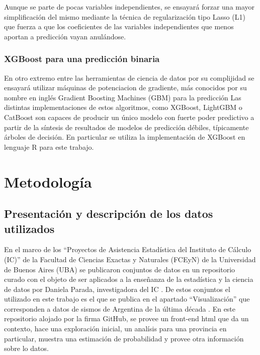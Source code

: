 \documentclass[a4paper]{report}
\begin{document}
Aunque se parte de pocas variables independientes, se ensayará forzar una mayor simplificación del mismo mediante la técnica de regularización tipo Lasso (L1) que fuerza a que los coeficientes de las variables independientes que menos aportan a predicción vayan anulándose.


\subsection{XGBoost para una predicción binaria}

En otro extremo entre las herramientas de ciencia de datos por su complijidad se ensayará utilizar máquinas de potenciacion de gradiente, más conocidos por su nombre en inglés Gradient Boosting Machines (GBM) para la predicción
Las distintas implementaciones de estos algoritmos, como XGBoost, LightGBM o CatBoost son capaces de producir un único modelo con fuerte poder predictivo a partir de la síntesis de resultados de modelos de predicción débiles, típicamente árboles de decisión. 
En particular se utiliza la implementación de XGBoost en lenguaje R para este trabajo.






\chapter{Metodología}

\section{Presentación y descripción de los datos utilizados}

En el marco de los ``Proyectos de Asistencia Estadística del Instituto de Cálculo (IC)'' de la Facultad de Ciencias Exactas y Naturales (FCEyN) de la Universidad de Buenos Aires (UBA) se publicaron conjuntos de datos en un repositorio curado con el objeto de ser aplicados a la enseñanza de la estadística y la ciencia de datos por Daniela Parada, investigadora del IC \cite{noauthor_ic-datasets-docencia_nodate}.
De estos conjuntos el utilizado en este trabajo es el que se publica en el apartado ``Visualización'' que corresponden a datos de sismos de Argentina de la última década \cite{daniela_parada_ic-datasets-docencia_nodate}. 
En este repositorio alojado por la firma GitHub, se provee un front-end html que da un contexto, hace una exploración inicial, un analísis para una provincia en particular, muestra una estimación de probabilidad y provee otra información sobre lo datos.
\end{document}

